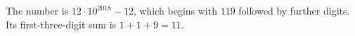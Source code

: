 The number is $12\cdot10^{2018}-12$, which begins with $119$ followed by further digits. Its first-three-digit sum is $1+1+9=\boxed{11}$.
